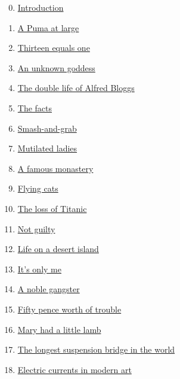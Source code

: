 \documentclass[11pt]{article}
\begin{document}
\begin{multicols}{2}
	\begin{enumerate}
		\setcounter{enumi}{-1}
		\item \href{https://mp.weixin.qq.com/s/X1c9BviD0zEohuZUsFjOWg}{Introduction}	%
		\item \href{https://mp.weixin.qq.com/s/RoAgxHNxwj8QtGOI9G-LIA}{A Puma at large}	%
		\item \href{https://mp.weixin.qq.com/s/vf8Cq-IzCYZeqVWD_MFx3Q}{Thirteen equals one}	%
		\item \href{https://mp.weixin.qq.com/s/UFy0iCPfjTmIola1PA8E3g}{An unknown goddess}	%
		\item \href{https://mp.weixin.qq.com/s/dGNFqV1y7jZ6PptjGY4ljA}{The double life of Alfred Bloggs}	%
		\item \href{https://mp.weixin.qq.com/s/DjCiOj1hr_WRaaCl99GwmA}{The facts}	%
		\item \href{https://mp.weixin.qq.com/s/Yl-ZoP_rxixOxxd2v8zwGg}{Smash-and-grab}	%
		\item \href{https://mp.weixin.qq.com/s/IExM9be3Yfzg5igFunGIRQ}{Mutilated ladies}	%
		\item \href{https://mp.weixin.qq.com/s/fLwKkGwqn39NeuLYjlm-qg}{A famous monastery}	%
		\item \href{https://mp.weixin.qq.com/s/lUGzIMZ3nqP9Xxow4JVtbA}{Flying cats}	%
		\item \href{https://mp.weixin.qq.com/s/x_xdUeC3vXxkgpe1ojen7w}{The loss of Titanic}	%
		\item \href{https://mp.weixin.qq.com/s/uxvxnyS_UONCeFYIPFcysg}{Not guilty}	%
		\item \href{https://mp.weixin.qq.com/s/JdbcuKlMHSXQ5iT_5e9hmw}{Life on a desert island}	%
		\item \href{https://mp.weixin.qq.com/s/Ae1yRtaM0H9OiAJZJYPwsw}{It's only me}	%
		\item \href{https://mp.weixin.qq.com/s/U2i3xo6mqj9WHSp82AvIyQ}{A noble gangster}	%
		\item \href{https://mp.weixin.qq.com/s/I6cdUP9twGo-dUFugG_kpg}{Fifty pence worth of trouble}	%
		\item \href{https://mp.weixin.qq.com/s/3RIpntK7-PGTqs2HY61Xfw}{Mary had a little lamb}	%
		\item \href{https://mp.weixin.qq.com/s/gjn0BkifHeHwQtKet4Go5w}{The longest suspension bridge in the world}	%
		\item \href{https://mp.weixin.qq.com/s/2yM2j_ORuq3VBqo4cK898A}{Electric currents in modern art}	%

\end{enumerate}
\end{multicols}
\end{document}
